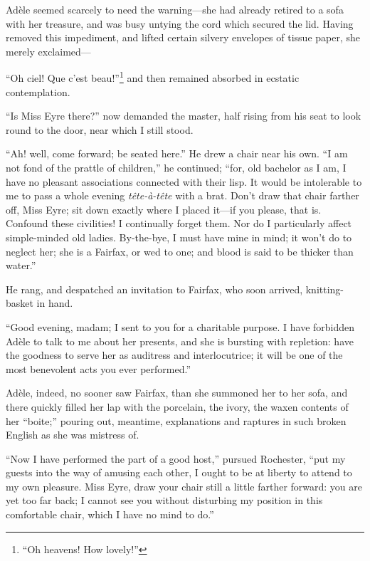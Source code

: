 Adèle seemed scarcely to need the warning---she had already retired to a
sofa with her treasure, and was busy untying the cord which secured the
lid. Having removed this impediment, and lifted certain silvery
envelopes of tissue paper, she merely exclaimed---

\foreignquote{french}{Oh ciel! Que c'est beau!}\footnote{\enquote{Oh heavens! How lovely!}} and then remained absorbed in
ecstatic contemplation.

\enquote{Is Miss Eyre there?} now demanded the master, half rising from
his seat to look round to the door, near which I still stood.

\enquote{Ah! well, come forward; be seated here.} He drew a chair near
his own. \enquote{I am not fond of the prattle of children,} he
continued; \enquote{for, old bachelor as I am, I have no pleasant associations
	connected with their lisp. It would be intolerable to me to pass a
	whole evening \emph{tête-à-tête} with a brat. Don't draw that chair
	farther off, Miss Eyre; sit down exactly where I placed it---if you
	please, that is. Confound these civilities! I continually forget
	them. Nor do I particularly affect simple-minded old ladies.
	By-the-bye, I must have mine in mind; it won't do to neglect her; she is
	a Fairfax, or wed to one; and blood is said to be thicker than water.}

He rang, and despatched an invitation to \Mrs{} Fairfax, who soon arrived,
knitting-basket in hand.

\enquote{Good evening, madam; I sent to you for a charitable purpose. I
	have forbidden Adèle to talk to me about her presents, and she is
	bursting with repletion: have the goodness to serve her as auditress and
	interlocutrice; it will be one of the most benevolent acts you ever
	performed.}

Adèle, indeed, no sooner saw \Mrs{} Fairfax, than she summoned her to her
sofa, and there quickly filled her lap with the porcelain, the ivory,
the waxen contents of her \foreignquote{french}{boite;} pouring out, meantime,
explanations and raptures in such broken English as she was mistress of.

\enquote{Now I have performed the part of a good host,} pursued \Mr{}
Rochester, \enquote{put my guests into the way of amusing each other, I
	ought to be at liberty to attend to my own pleasure. Miss Eyre, draw
	your chair still a little farther forward: you are yet too far back; I
	cannot see you without disturbing my position in this comfortable chair,
	which I have no mind to do.}

